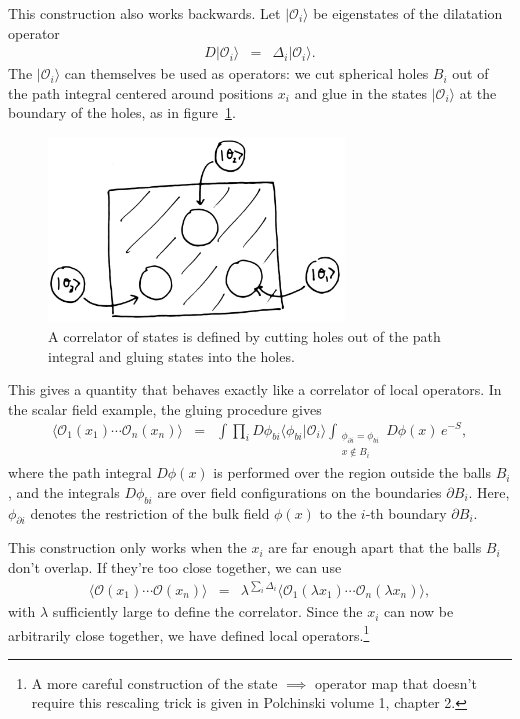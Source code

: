 \documentclass{ws-rv9x6}
\newcommand\be{\begin{eqnarray}}
\newcommand\ee{\end{eqnarray}}
\newcommand\cO{\mathcal{O}}
\newcommand\ptl\partial
\newcommand\<\langle
\renewcommand\>\rangle
\renewcommand\.{\cdot}
\newcommand\De{\Delta}
\renewcommand\l\lambda
\begin{document}
This construction also works backwards. Let $|\cO_i\>$ be eigenstates of the dilatation operator
\be
D |\cO_i\> &=& \De_i |\cO_i\>.
\ee
The $|\cO_i\>$ can themselves be used as operators: we cut spherical holes $B_i$ out of the path integral centered around positions $x_i$ and glue in the states $|\cO_i\>$ at the boundary of the holes, as in figure~\ref{fig:correlatorofstates}.
\begin{figure}
\begin{center}
\includegraphics[width=0.7\textwidth]{correlatorofstates.jpg}
\end{center}
\caption{A correlator of states is defined by cutting holes out of the path integral and gluing states into the holes.  \label{fig:correlatorofstates}}
\end{figure}
This gives a quantity that behaves exactly like a correlator of local operators.
In the scalar field example, the gluing procedure gives
\be
\<\cO_1(x_1)\cdots \cO_n(x_n)\> &=& \int \prod_i D\phi_{bi} \<\phi_{bi}|\cO_i\> \int_{\substack{\phi_{\ptl i}=\phi_{bi}\\ x \notin B_i }} D\phi(x)\, e^{-S},
\ee
where the path integral $D\phi(x)$ is performed over the region outside the balls $B_i$, and the integrals $D\phi_{bi}$ are over field configurations on the boundaries $\ptl B_i$. Here, $\phi_{\ptl i}$ denotes the restriction of the bulk field $\phi(x)$ to the $i$-th boundary $\ptl B_i$.

This construction only works when the $x_i$ are far enough apart that the balls $B_i$ don't overlap.  If they're too close together, we can use
\be
\<\cO(x_1)\cdots \cO(x_n)\> &=& \lambda^{\sum_i \Delta_i}\<\cO_1(\lambda x_1)\cdots \cO_n(\lambda x_n)\>,
\ee
with $\l$ sufficiently large to define the correlator.  Since the $x_i$ can now be arbitrarily close together, we have defined local operators.\footnote{A more careful construction of the state $\implies$ operator map that doesn't require this rescaling trick is given in Polchinski \cite{Polchinski:1998rq} volume 1, chapter 2.}
\end{document}
